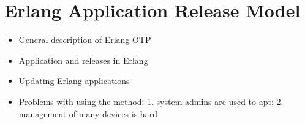 \section{Erlang Application Release Model}


\begin{itemize}
	\item General description of Erlang OTP
	\item Application and releases in Erlang
	\item Updating Erlang applications 
	\item Problems with using the method: 1. system admins are used to apt; 2. management of many devices is hard
\end{itemize}
